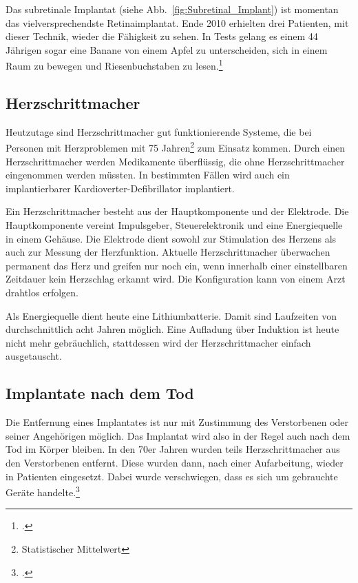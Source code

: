 Das subretinale Implantat (siehe Abb.~\vref{fig:Subretinal_Implant}) ist momentan das
vielversprechendste Retinaimplantat. Ende 2010 erhielten
drei Patienten, mit dieser Technik, wieder die Fähigkeit zu sehen. In Tests gelang es einem 44
Jährigen sogar eine Banane von einem Apfel zu unterscheiden, sich in einem Raum zu bewegen und
Riesenbuchstaben zu lesen.\footcite{Independent:retina_chip}

\subsection{Herzschrittmacher}
\label{sec:Robin:topical:Pacemaker}
Heutzutage sind Herzschrittmacher gut funktionierende Systeme, die bei Personen mit Herzproblemen mit
75 Jahren\footnote{Statistischer Mittelwert} zum Einsatz kommen. Durch einen Herzschrittmacher werden
Medikamente überflüssig, die ohne Herzschrittmacher eingenommen werden müssten.
In bestimmten Fällen wird auch ein implantierbarer Kardioverter-Defibrillator implantiert.

Ein Herzschrittmacher besteht aus der Hauptkomponente und der Elektrode. Die Hauptkomponente vereint
Impulsgeber, Steuerelektronik und eine Energiequelle in einem Gehäuse. Die Elektrode dient sowohl zur
Stimulation des Herzens als auch zur Messung der Herzfunktion. Aktuelle Herzschrittmacher überwachen
permanent das Herz und greifen nur noch ein, wenn innerhalb einer einstellbaren Zeitdauer kein
Herzschlag erkannt wird. Die Konfiguration kann von einem Arzt drahtlos erfolgen.

Als Energiequelle dient heute eine Lithiumbatterie. Damit sind Laufzeiten von durchschnittlich acht
Jahren möglich. Eine Aufladung über Induktion ist heute nicht mehr gebräuchlich, stattdessen wird der
Herzschrittmacher einfach ausgetauscht.

\subsection{Implantate nach dem Tod}
Die Entfernung eines Implantates ist nur mit Zustimmung des Verstorbenen oder seiner Angehörigen
möglich. Das Implantat wird also in der Regel auch nach dem Tod im Körper bleiben. In den 70er Jahren
wurden teils Herzschrittmacher aus den Verstorbenen entfernt. Diese wurden dann, nach einer
Aufarbeitung, wieder in Patienten eingesetzt. Dabei wurde verschwiegen, dass es sich um gebrauchte
Geräte handelte.\footcite{Spiegel:Herzschrittmacher-Prozess}
